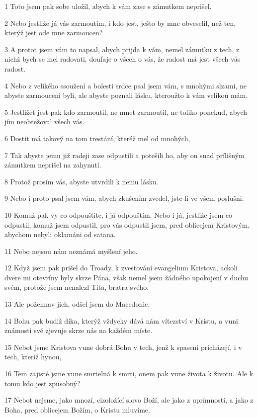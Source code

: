 \par 1 Toto jsem pak sobe uložil, abych k vám zase s zámutkem neprišel.
\par 2 Nebo jestliže já vás zarmoutím, i kdo jest, ješto by mne obveselil, než ten, kterýž jest ode mne zarmoucen?
\par 3 A protot jsem vám to napsal, abych prijda k vám, nemel zámutku z tech, z nichž bych se mel radovati, doufaje o všech o vás, že radost má jest všech vás radost.
\par 4 Nebo z velikého ssoužení a bolesti srdce psal jsem vám, s mnohými slzami, ne abyste zarmouceni byli, ale abyste poznali lásku, kteroužto k vám velikou mám.
\par 5 Jestližet jest pak kdo zarmoutil, ne mnet zarmoutil, ne toliko ponekud, abych jím neobtežoval všech vás.
\par 6 Dostit má takový na tom trestání, kteréž mel od mnohých,
\par 7 Tak abyste jemu již radeji zase odpustili a potešili ho, aby on snad prílišným zámutkem neprišel na zahynutí.
\par 8 Protož prosím vás, abyste utvrdili k nemu lásku.
\par 9 Nebo i proto psal jsem vám, abych zkušením zvedel, jste-li ve všem poslušni.
\par 10 Komuž pak vy co odpouštíte, i já odpouštím. Nebo i já, jestliže jsem co odpustil, komuž jsem odpustil, pro vás odpustil jsem, pred oblicejem Kristovým, abychom nebyli oklamáni od satana.
\par 11 Nebo nejsou nám neznámá myšlení jeho.
\par 12 Když jsem pak prišel do Troady, k zvestování evangelium Kristova, ackoli dvere mi otevríny byly skrze Pána, však nemel jsem žádného upokojení v duchu svém, protože jsem nenalezl Tita, bratra svého.
\par 13 Ale požehnav jich, odšel jsem do Macedonie.
\par 14 Bohu pak budiž díka, kterýž vždycky dává nám vítezství v Kristu, a vuni známosti své zjevuje skrze nás na každém míste.
\par 15 Nebot jsme Kristova vune dobrá Bohu v tech, jenž k spasení pricházejí, i v tech, kteríž hynou,
\par 16 Tem zajisté jsme vune smrtelná k smrti, onem pak vune života k životu. Ale k tomu kdo jest zpusobný?
\par 17 Nebot nejsme, jako mnozí, cizoložící slovo Boží, ale jako z uprímnosti, a jako z Boha, pred oblicejem Božím, o Kristu mluvíme.

